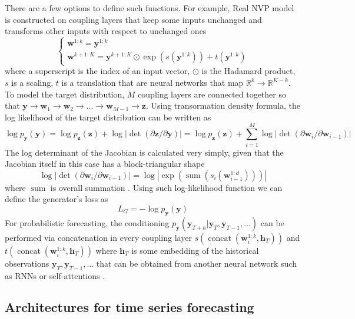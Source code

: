 \documentclass[12pt,a4paper]{article}
\begin{document}
There are a few options to define such functions. For example, Real NVP \cite{normflow2021} model is constructed on coupling layers that keep some inputs unchanged and transforms other inputs with respect to unchanged ones
$$
\begin{cases}
    \mathbf w^{1:k} = \mathbf y^{1:k} \\
    \mathbf w^{k+1:K} = \mathbf y^{k+1:K} \odot \exp(s(\mathbf y^{1:k})) + t(\mathbf y^{1:k})
\end{cases}
$$
where a superscript is the index of an input vector, $\odot$ is the Hadamard product, $s$ is a scaling, $t$ is a translation that are neural networks that map $\mathbb R^k \to \mathbb R^{K-k}$. To model the target distribution, $M$ coupling layers are connected together so that $\mathbf{y} \to \mathbf{w}_1 \to \mathbf{w}_2 \to \dots \to \mathbf{w}_{M-1} \to \mathbf{z}$. Using transormation density formula, the log likelihood of the target distribution can be written as
$$\log p_{\mathbf{y}}(\mathbf{y})=\log p_{\mathbf{z}}(\mathbf{z})+\log |\operatorname{det}(\partial \mathbf{z} / \partial \mathbf{y})|=\log p_{\mathbf{z}}(\mathbf{z})+\sum_{i=1}^{M} \log \left|\operatorname{det}\left(\partial \mathbf{w}_{i} / \partial \mathbf{w}_{i-1}\right)\right|$$
The log determinant of the Jacobian is calculated very simply, given that the Jacobian itself in this case has a block-triangular shape 
$$\log \left|\operatorname{det}\left(\partial \mathbf{w}_{i} / \partial \mathbf{w}_{i-1}\right)\right| = \log \left| \exp \left(\operatorname{sum}\left(s_{i}\left(\mathbf{w}_{i-1}^{1: d}\right)\right) \right) \right|$$
where $\operatorname{sum}$ is overall summation \cite{normflow2021}. Using such log-likelihood function we can define the generator's loss as
$$L_G = -\log p_\mathbf{y}(\mathbf y)$$
For probabilistic forecasting, the conditioning $p_\mathbf{y}(\mathbf{y}_{T+h}| \mathbf{y}_T, \mathbf y_{T-1}, \dots)$ can be performed via concatenation in every coupling layer $s(\operatorname{concat}(\mathbf w_i^{1:k}, \mathbf h_T))$ and $t(\operatorname{concat}(\mathbf w_i^{1:k}, \mathbf h_T))$ where $\mathbf{h}_T$ is some embedding of the historical observations $\mathbf y_{T}, \mathbf y_{T-1}, \dots$ that can be obtained from another neural network such as RNNs or self-attentions \cite{normflow2021}.

\subsection{Architectures for time series forecasting}
\end{document}
